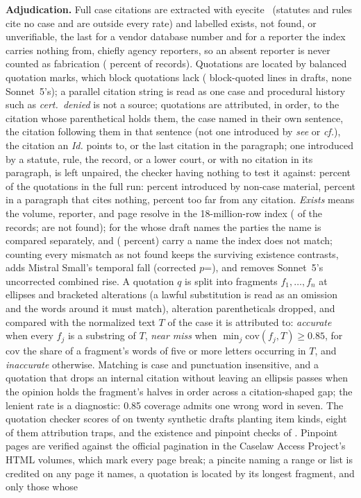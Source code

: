 \documentclass{IOS-Book-Article}
\begin{document}
\textbf{Adjudication.} Full case citations are extracted with eyecite~\cite{cushman2021eyecite} (statutes and rules cite no case and are outside every rate) and labelled exists, not found, or unverifiable, the last for a vendor database number and for a reporter the index carries nothing from, chiefly agency reporters, so an absent reporter is never counted as fabrication (\unverifiablePct{} percent of \nCitationRecords{} records). Quotations are located by balanced quotation marks, which block quotations lack (\blockLines{} block-quoted lines in \blockTotalDrafts{} drafts, none Sonnet~5's); a parallel citation string is read as one case and procedural history such as \textit{cert.\ denied} is not a source; quotations are attributed, in order, to the citation whose parenthetical holds them, the case named in their own sentence, the citation following them in that sentence (not one introduced by \textit{see} or \textit{cf.}), the citation an \textit{Id.} points to, or the last citation in the paragraph; one introduced by a statute, rule, the record, or a lower court, or with no citation in its paragraph, is left unpaired, the checker having nothing to test it against: \unpairedPctAll{} percent of the \quotesAll{} quotations in the full run: \unpairedNoncasePct{} percent introduced by non-case material, \unpairedNoCitePct{} percent in a paragraph that cites nothing, \unpairedFarPct{} percent too far from any citation. \textit{Exists} means the volume, reporter, and page resolve in the 18-million-row index (\nResolving{} of the \nCitationRecords{} records; \nNotFoundAll{} are not found); for the \nmChecked{} whose draft names the parties the name is compared separately, and \nmMismatch{} (\nmPct{} percent) carry a name the index does not match; counting every mismatch as not found keeps the \nmSurvKept{} surviving existence contrasts, adds Mistral Small's temporal fall (corrected $p$=\nmGainMistralTemporalHolm), and removes Sonnet~5's uncorrected combined rise. A quotation $q$ is split into fragments $f_1, \dots, f_n$ at ellipses and bracketed alterations (a lawful substitution is read as an omission and the words around it must match), alteration parentheticals dropped, and compared with the normalized text $T$ of the case it is attributed to: \textit{accurate} when every $f_j$ is a substring of $T$, \textit{near miss} when $\min_j \mathrm{cov}(f_j, T) \ge 0.85$, for $\mathrm{cov}$ the share of a fragment's words of five or more letters occurring in $T$, and \textit{inaccurate} otherwise. Matching is case and punctuation insensitive, and a quotation that drops an internal citation without leaving an ellipsis passes when the opinion holds the fragment's halves in order across a citation-shaped gap; the lenient rate is a diagnostic: 0.85 coverage admits one wrong word in seven. The quotation checker scores \valQtwoPass{} of \valQtwoTotal{} on twenty synthetic drafts planting \valQtwoKinds{} item kinds, eight of them attribution traps, and the existence and pinpoint checks \valPinsPass{} of \valPinsTotal{}. Pinpoint pages are verified against the official pagination in the Caselaw Access Project's HTML volumes, which mark every page break; a pincite naming a range or list is credited on any page it names, a quotation is located by its longest fragment, and only those whose 
\end{document}
